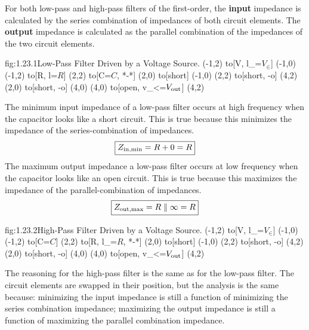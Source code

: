 For both low-pass and high-pass filters of the first-order, the \textbf{input} impedance is calculated by the series combination of impedances of both circuit elements.  The \textbf{output} impedance is calculated as the parallel combination of the impedances of the two circuit elements.
\begin{circuit}{fig:1.23.1}{Low-Pass Filter Driven by a Voltage Source.}
    (-1,2) to[V, l_=$V_\in$] (-1,0)
    (-1,2) to[R, l=$R$] (2,2)
    to[C=$C$, *-*] (2,0)
    to[short] (-1,0)
    (2,2)  to[short, -o] (4,2)
    (2,0) to[short, -o] (4,0)
    (4,0) to[open, v_<=$V_{\text{out}}$] (4,2)
\end{circuit}
The minimum input impedance of a low-pass filter occurs at high frequency when the capacitor looks like a short circuit.  This is true because this minimizes the impedance of the series-combination of impedances.
\[\boxed{Z_{\text{in},\min} = R + 0 = R}\]
The maximum output impedance a low-pass filter occurs at low frequency when the capacitor looks like an open circuit.  This is true because this maximizes the impedance of the parallel-combination of impedances.
\[\boxed{Z_{\text{out},\max} = R \parallel \infty = R}\]
\begin{circuit}{fig:1.23.2}{High-Pass Filter Driven by a Voltage Source.}
    (-1,2) to[V, l_=$V_\in$] (-1,0)
    (-1,2) to[C=$C$] (2,2)
    to[R, l_=$R$, *-*] (2,0)
    to[short] (-1,0)
    (2,2)  to[short, -o] (4,2)
    (2,0) to[short, -o] (4,0)
    (4,0) to[open, v_<=$V_{\text{out}}$] (4,2)
\end{circuit}
The reasoning for the high-pass filter is the same as for the low-pass filter.  The circuit elements are swapped in their position, but the analysis is the same because: minimizing the input impedance is still a function of minimizing the series combination impedance; maximizing the output impedance is still a function of maximizing the parallel combination impedance.



